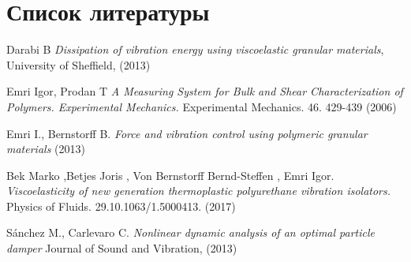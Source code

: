 
\newpage
\section{Список литературы}
\begin{thebibliography}{9}
	Darabi B
	\textit{Dissipation of vibration energy using viscoelastic granular materials},
	University of Sheffield, (2013)

	Emri Igor,  Prodan T
	\textit{A Measuring System for Bulk and Shear Characterization of
	Polymers. Experimental Mechanics.}
	Experimental Mechanics. 46. 429-439 (2006)

	Emri I., Bernstorff B.
	\textit{Force and vibration control using polymeric granular materials}
	(2013)

	Bek Marko ,Betjes Joris , Von Bernstorff Bernd-Steffen , Emri Igor.
	\textit{Viscoelasticity of new generation thermoplastic polyurethane vibration isolators.}
	Physics of Fluids. 29.10.1063/1.5000413. (2017) 

	Sánchez M., Carlevaro C.
	\textit{Nonlinear dynamic analysis of an optimal particle damper}
	Journal of Sound and Vibration, (2013)

\end{thebibliography}